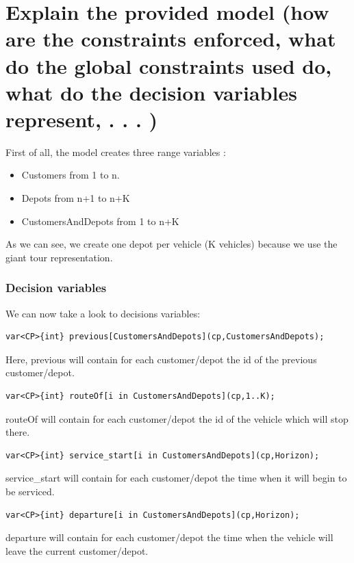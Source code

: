 \documentclass[a4paper ,12pt,french]{article}
\begin{document}
\tableofcontents %

\thispagestyle{fancy}

\pagebreak
\setcounter{page}{1}
\pagestyle{fancy} %

\section{Explain the provided model (how are the constraints enforced, what do the global constraints used do, what do the decision variables represent, . . . )}



First of all, the model creates three range variables : 
\begin{itemize}
\item Customers from 1 to n.
\item Depots from n+1 to n+K
\item CustomersAndDepots from 1 to n+K
\end{itemize}
As we can see, we create one depot per vehicle (K vehicles) because we use the giant tour representation.\\

\subsubsection*{Decision variables}
We can now take a look to decisions variables:
\begin{verbatim}
var<CP>{int} previous[CustomersAndDepots](cp,CustomersAndDepots);
\end{verbatim}
Here, previous will contain for each customer/depot the id of the previous customer/depot.

\begin{verbatim}
var<CP>{int} routeOf[i in CustomersAndDepots](cp,1..K);
\end{verbatim}
routeOf will contain for each customer/depot the id of the vehicle which will stop there.

\begin{verbatim}
var<CP>{int} service_start[i in CustomersAndDepots](cp,Horizon);
\end{verbatim}
service\_start will contain for each customer/depot the time when it will begin to be serviced.

\begin{verbatim}
var<CP>{int} departure[i in CustomersAndDepots](cp,Horizon);
\end{verbatim}
departure will contain  for each customer/depot the time when the vehicle will leave the current customer/depot.
\end{document}
